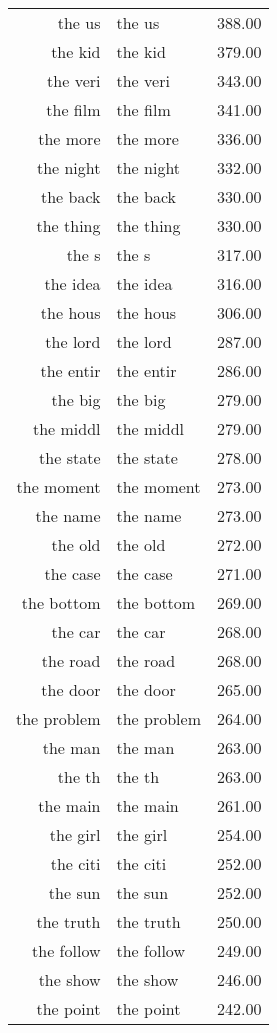 \begin{table}[ht]
\begin{tabular}{rlr}
  the us & the us & 388.00 \\ 
  the kid & the kid & 379.00 \\ 
  the veri & the veri & 343.00 \\ 
  the film & the film & 341.00 \\ 
  the more & the more & 336.00 \\ 
  the night & the night & 332.00 \\ 
  the back & the back & 330.00 \\ 
  the thing & the thing & 330.00 \\ 
  the s & the s & 317.00 \\ 
  the idea & the idea & 316.00 \\ 
  the hous & the hous & 306.00 \\ 
  the lord & the lord & 287.00 \\ 
  the entir & the entir & 286.00 \\ 
  the big & the big & 279.00 \\ 
  the middl & the middl & 279.00 \\ 
  the state & the state & 278.00 \\ 
  the moment & the moment & 273.00 \\ 
  the name & the name & 273.00 \\ 
  the old & the old & 272.00 \\ 
  the case & the case & 271.00 \\ 
  the bottom & the bottom & 269.00 \\ 
  the car & the car & 268.00 \\ 
  the road & the road & 268.00 \\ 
  the door & the door & 265.00 \\ 
  the problem & the problem & 264.00 \\ 
  the man & the man & 263.00 \\ 
  the th & the th & 263.00 \\ 
  the main & the main & 261.00 \\ 
  the girl & the girl & 254.00 \\ 
  the citi & the citi & 252.00 \\ 
  the sun & the sun & 252.00 \\ 
  the truth & the truth & 250.00 \\ 
  the follow & the follow & 249.00 \\ 
  the show & the show & 246.00 \\ 
  the point & the point & 242.00 \\ 

\end{tabular}
\end{table}
